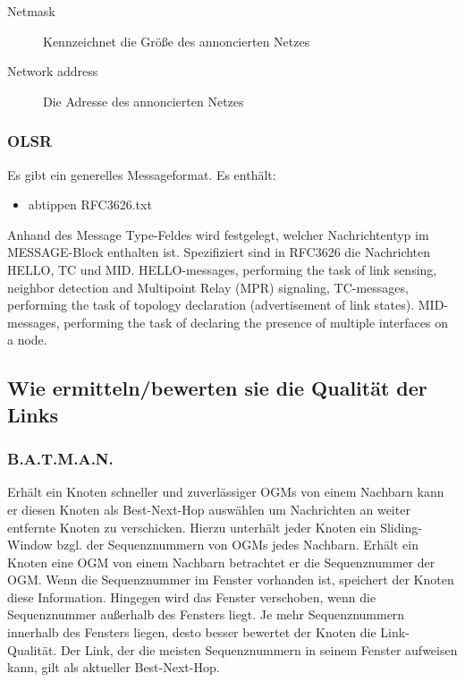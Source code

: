 \documentclass[a4paper,10pt]{article}
\begin{document}
\begin{description}
  \item[Netmask] Kennzeichnet die Größe des annoncierten Netzes
  \item[Network address] Die Adresse des annoncierten Netzes
\end{description}


\subsubsection*{OLSR}

Es gibt ein generelles Messageformat. Es enthält:

\begin{itemize}
  \item abtippen RFC3626.txt
\end{itemize}

Anhand des Message Type-Feldes wird festgelegt, welcher Nachrichtentyp im MESSAGE-Block enthalten ist. Spezifiziert sind in RFC3626 die Nachrichten HELLO, TC und MID.
HELLO-messages, performing the task of link sensing, neighbor detection and Multipoint Relay (MPR) signaling,
TC-messages, performing the task of topology declaration (advertisement of link states).
MID-messages, performing the task of declaring the presence of multiple interfaces on a node.

\subsection{Wie ermitteln/bewerten sie die Qualität der Links}


\subsubsection*{B.A.T.M.A.N.}

Erhält ein Knoten schneller und zuverlässiger OGMs von einem Nachbarn kann er diesen Knoten als Best-Next-Hop auswählen um Nachrichten an weiter entfernte Knoten zu verschicken.
Hierzu unterhält jeder Knoten ein Sliding-Window bzgl. der Sequenznummern von OGMs jedes Nachbarn. 
Erhält ein Knoten eine OGM von einem Nachbarn betrachtet er die Sequenznummer der OGM.
Wenn die Sequenznummer im Fenster vorhanden ist, speichert der Knoten diese Information.
Hingegen wird das Fenster verschoben, wenn die Sequenznummer außerhalb des Fensters liegt.
Je mehr Sequenznummern innerhalb des Fensters liegen, desto besser bewertet der Knoten die Link-Qualität.
Der Link, der die meisten Sequenznummern in seinem Fenster aufweisen kann, gilt als aktueller Best-Next-Hop.
\end{document}
